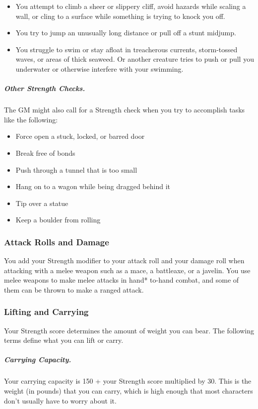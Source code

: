 \begin{itemize}
\item You attempt to climb a sheer or slippery cliff, avoid hazards while scaling a wall, or cling to a surface while something is trying to knock you off.
\item You try to jump an unusually long distance or pull off a stunt midjump.
\item You struggle to swim or stay afloat in treacherous currents, storm-tossed waves, or areas of thick seaweed. Or another creature tries to push or pull you underwater or otherwise interfere with your swimming.
\end{itemize}

\subparagraph*{Other Strength Checks.} The GM might also call for a Strength check when you try to accomplish tasks like the following:

\begin{itemize}
\item Force open a stuck, locked, or barred door
\item Break free of bonds
\item Push through a tunnel that is too small
\item Hang on to a wagon while being dragged behind it
\item Tip over a statue
\item Keep a boulder from rolling
\end{itemize}

\subsubsection{Attack Rolls and Damage}

You add your Strength modifier to your attack roll and your damage roll when attacking with a melee weapon such as a mace, a battleaxe, or a javelin. You use melee weapons to make melee attacks in hand* to-hand combat, and some of them can be thrown to make a ranged attack.

\subsubsection{Lifting and Carrying}

Your Strength score determines the amount of weight you can bear. The following terms define what you can lift or carry.

\subparagraph*{Carrying Capacity.} Your carrying capacity is 150 + your Strength score multiplied by 30. This is the weight (in pounds) that you can carry, which is high enough that most characters don't usually have to worry about it.

